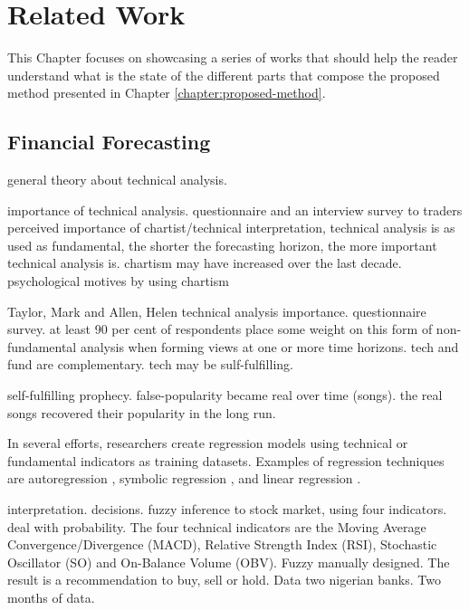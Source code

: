 \chapter{Related Work}
\label{chapter:related-work}

This Chapter focuses on showcasing a series of works that should help the reader
understand what is the state of the different parts that compose the proposed
method presented in Chapter \ref{chapter:proposed-method}.

\section{Financial Forecasting}
\label{section:financial-forecasting}

\cite{Achelis2000} general theory about technical analysis.

\cite{Kadiri2015} importance of technical analysis. questionnaire and an interview survey to traders perceived
importance of chartist/technical interpretation, technical analysis is as used
as fundamental, the shorter the forecasting horizon, the more important
technical analysis is. chartism may have increased over the last
decade. psychological motives by using chartism

Taylor, Mark and Allen, Helen \cite{Fund1992} technical analysis
importance. questionnaire survey. at least 90 per cent of respondents place some
weight on this form of non-fundamental analysis when forming views at one or
more time horizons. tech and fund are complementary. tech may be sulf-fulfilling.

\cite{Salganik2008} self-fulfilling prophecy. false-popularity became real over time (songs). the
real songs recovered their popularity in the long run.

In several efforts, researchers create regression models using technical or
fundamental indicators as training datasets. Examples of regression techniques
are autoregression \cite{burg1968new}, symbolic regression
\cite{billard2002symbolic}, and linear regression \cite{kutner2004applied}.

\cite{Ijegwa2014} interpretation. decisions. fuzzy inference to stock market, using four
indicators. deal with probability. The four technical indicators are the
Moving Average Convergence/Divergence (MACD), Relative Strength Index (RSI),
Stochastic Oscillator (SO) and On-Balance Volume (OBV). Fuzzy manually
designed. The result is a recommendation to buy, sell or hold. Data two nigerian
banks. Two months of data.

